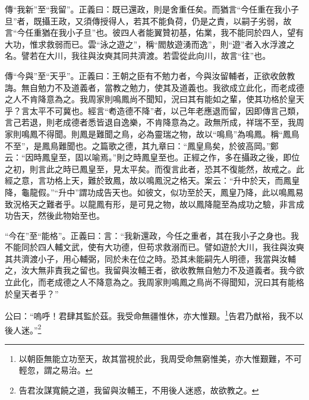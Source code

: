 {\noindent\zhuan{}\fzbyks 傳“我新”至“我留”。正義曰：既已還政，則是舍重任矣。而猶言“今任重在我小子旦”者，既攝王政，又須傳授得人，若其不能負荷，仍是之責，以嗣子劣弱，故言“今任重猶在我小子旦”也。彼四人者能翼贊初基，佑業，我不能同於四人，望有大功，惟求救弱而已。雲“泳之遊之”，稱“閻敖遊湧而逸”，則“遊”者入水浮渡之名。譬若在大川，我往與汝奭其同共濟渡。若雲從此向川，故言“往”也。 \par}

{\noindent\zhuan{}\fzbyks 傳“今與”至“天乎”。正義曰：王朝之臣有不勉力者，今與汝留輔者，正欲收斂教誨。無自勉力不及道義者，當教之勉力，使其及道義也。我欲成立此化，而老成德之人不肯降意為之。我周家則鳴鳳尚不聞知，況曰其有能如之輩，使其功格於皇天乎？言太平不可冀也。經言“耇造德不降”者，以己年老應退而留，因即傳言己類，言己若退，則老成德者悉皆退自逸樂，不肯降意為之。政無所成，祥瑞不至，我周家則鳴鳳不得聞。則鳳是難聞之鳥，必為靈瑞之物，故以“鳴鳥”為鳴鳳。稱“鳳鳥不至”，是鳳鳥難聞也。之篇歌之德，其九章曰：“鳳皇鳥矣，於彼高岡。”鄭云：“因時鳳皇至，固以喻焉。”則之時鳳皇至也。正經之作，多在攝政之後，即位之初，則言此之時已鳳皇至，見太平矣。而復言此者，恐其不復能然，故戒之。此經之意，言功格上天，難於致鳳，故以鳴鳳況之格天。案云：“升中於天，而鳳皇降，龜龍假。”“升中”謂功成告天也。如彼文，似功至於天，鳳皇乃降，此以鳴鳳易致況格天之難者乎。以龍鳳有形，是可見之物，故以鳳降龍至為成功之驗，非言成功告天，然後此物始至也。 \par}

{\noindent\shu{}\fzkt “今在”至“能格”。正義曰：言：“我新還政，今任之重者，其在我小子之身也。我不能同於四人輔文武，使有大功德，但苟求救溺而已。譬如遊於大川，我往與汝奭其共濟渡小子，用心輔弼，同於未在位之時。恐其未能嗣先人明德，我當與汝輔之，汝大無非責我之留也。我留與汝輔王者，欲收教無自勉力不及道義者。我今欲立此化，而老成德之人不降意為之。我周家則鳴鳳之鳥尚不得聞知，況曰其有能格於皇天者乎？” \par}

公曰：“嗚呼！君肆其監於茲。我受命無疆惟休，亦大惟艱。\footnote{以朝臣無能立功至天，故其當視於此，我周受命無窮惟美，亦大惟艱難，不可輕忽，謂之易治。}告君乃猷裕，我不以後人迷。”\footnote{告君汝謀寬饒之道，我留與汝輔王，不用後人迷惑，故欲教之。}


